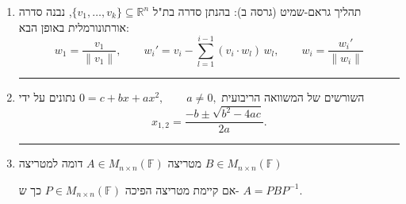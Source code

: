\documentclass[12pt, a4paper]{article}
\newcommand{\ff}{\mathbb{F}}
\newcommand{\rr}{\mathbb{R}}
\begin{document}
\begin{enumerate}
אז $\{w_1,\ldots,w_m\}$ בסיס אורתוגונלי של $W$ כאשר
\[
w_1=v_1,\qquad
w_k=v_k-\sum_{i=1}^{k-1}\frac{ v_k\cdot w_i}{ w_i\cdot w_i}\,w_i
\quad (k=2,\ldots,m).
\]
\item תהליך גראם-שמיט (גרסה ב):
בהנתן סדרה בת"ל
$\{v_1,\ldots,v_k\}\subseteq \rr^n$, נבנה סדרה אורתונורמלית באופן הבא:
\[
w_1=\frac{v_1}{\|v_1\|},\qquad
w_i'=v_i-\sum_{l=1}^{i-1} (v_i\cdot w_l)\,w_l,\qquad w_i = \frac{w_i'}{\|w_i\|}
\]

\noindent\rule{\textwidth-30pt}{0.4pt}

\item השורשים של המשוואה הריבועית
$
0=c+bx+ax^2,\qquad a\ne 0,
$
נתונים על ידי
\[
x_{1,2}=\frac{-b\pm\sqrt{b^2-4ac}}{2a}.
\]

\noindent\rule{\textwidth-30pt}{0.4pt}

\item מטריצה $A\in M_{n\times n}(\ff)$ דומה למטריצה $B\in M_{n\times n}(\ff)$ 

אם
קיימת 
מטריצה הפיכה
$P\in M_{n\times n}(\ff)$ כך ש-
$A=PBP^{-1}$.
\end{enumerate}
\end{document}
